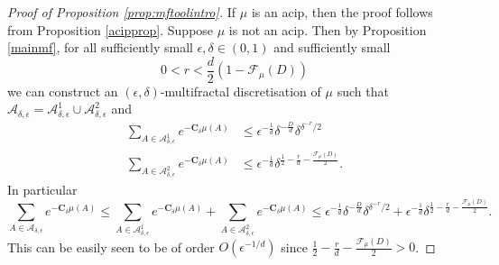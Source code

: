 \documentclass[11pt, reqno]{amsart}
\numberwithin{equation}{section}
\theoremstyle{plain}%
\theoremstyle{definition}
\def\F{\ensuremath{\mathcal F}}
\def\A{\ensuremath{\mathscr A}}
\renewcommand{\A}{\mathcal{A}}
\renewcommand{\F}{\mathcal{F}}
\theoremstyle{nonumberplain}
\begin{document}
\begin{proof}[Proof of Proposition \ref{prop:mftoolintro}]
If $\mu$ is an acip, then the proof follows from Proposition \ref{acipprop}. Suppose $\mu$ is not an acip. Then by Proposition \ref{mainmf}, for all sufficiently small $\epsilon, \delta \in (0,1)$ and sufficiently small
$$0<r<\frac{d}{2}(1-\F_\mu(D))$$
we can construct an $(\epsilon,\delta)$-multifractal discretisation of $\mu$ such that  $\A_{\delta,\epsilon}=\A_{\delta,\epsilon}^1\cup \A_{\delta,\epsilon}^2$ and 
\begin{align*}
\sum_{A \in \A^1_{\delta,\epsilon}} e^{-\mathbf{C}_\delta \mu(A)}& \leq \epsilon^{-\frac{1}{d}}\delta^{-\frac{D}{d}}\delta^{\delta^{-r}/2}\\
\sum_{A \in \A^2_{\delta,\epsilon}} e^{-\mathbf{C}_\delta \mu(A)} &\leq\epsilon^{-\frac{1}{d}} \delta^{\frac{1}{2}-\frac{r}{d}-\frac{\F_\mu(D)}{2}}.
\end{align*}
In particular
$$\sum_{A \in \A_{\delta,\epsilon}} e^{-\mathbf{C}_\delta \mu(A)} \leq \sum_{A \in \A^1_{\delta,\epsilon}} e^{-\mathbf{C}_\delta \mu(A)}+\sum_{A \in \A^2_{\delta,\epsilon}} e^{-\mathbf{C}_\delta \mu(A)} \leq\epsilon^{-\frac{1}{d}}\delta^{-\frac{D}{d}}\delta^{\delta^{-r}/2}+\epsilon^{-\frac{1}{d}} \delta^{\frac{1}{2}-\frac{r}{d}-\frac{\F_\mu(D)}{2}}.$$
This can be easily seen to be of order $O(\epsilon^{-1/d})$ since $\frac{1}{2}-\frac{r}{d}-\frac{\F_\mu(D)}{2}>0$.
\end{proof}
 
\end{document}
